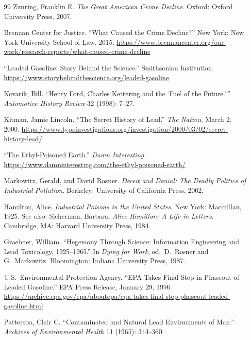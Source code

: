 \documentclass[12pt,openany]{book}
\begin{document}
\begin{thebibliography}{99}
Zimring, Franklin E. \textit{The Great American Crime Decline}. Oxford: Oxford University Press, 2007.

Brennan Center for Justice. ``What Caused the Crime Decline?'' New York: New York University School of Law, 2015. \url{https://www.brennancenter.org/our-work/research-reports/what-caused-crime-decline}


``Leaded Gasoline: Story Behind the Science.'' Smithsonian Institution. \url{https://www.storybehindthescience.org/leaded-gasoline}

Kovarik, Bill. ``Henry Ford, Charles Kettering and the `Fuel of the Future.'\,'' \textit{Automotive History Review} 32 (1998): 7--27.

Kitman, Jamie Lincoln. ``The Secret History of Lead.'' \textit{The Nation}, March 2, 2000. \url{https://www.typeinvestigations.org/investigation/2000/03/02/secret-history-lead/}

``The Ethyl-Poisoned Earth.'' \textit{Damn Interesting}. \url{https://www.damninteresting.com/the-ethyl-poisoned-earth/}

Markowitz, Gerald, and David Rosner. \textit{Deceit and Denial: The Deadly Politics of Industrial Pollution}. Berkeley: University of California Press, 2002.

Hamilton, Alice. \textit{Industrial Poisons in the United States}. New York: Macmillan, 1925. See also: Sicherman, Barbara. \textit{Alice Hamilton: A Life in Letters}. Cambridge, MA: Harvard University Press, 1984.

Graebner, William. ``Hegemony Through Science: Information Engineering and Lead Toxicology, 1925--1965.'' In \textit{Dying for Work}, ed.\ D.\ Rosner and G.\ Markowitz. Bloomington: Indiana University Press, 1987.

U.S.\ Environmental Protection Agency. ``EPA Takes Final Step in Phaseout of Leaded Gasoline.'' EPA Press Release, January 29, 1996. \url{https://archive.epa.gov/epa/aboutepa/epa-takes-final-step-phaseout-leaded-gasoline.html}

Patterson, Clair C. ``Contaminated and Natural Lead Environments of Man.'' \textit{Archives of Environmental Health} 11 (1965): 344--360.


\end{thebibliography}
\end{document}
